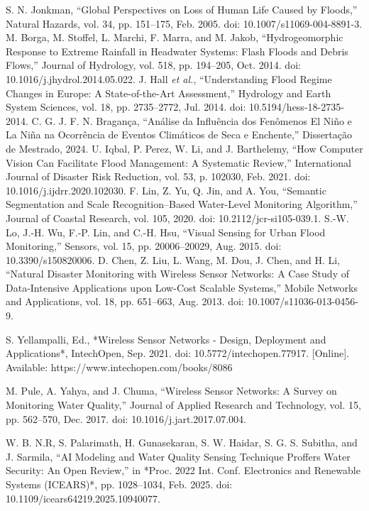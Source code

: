 \documentclass[conference]{IEEEtran}
\begin{document}
\begin{thebibliography}{00}
 S. N. Jonkman, 
``Global Perspectives on Loss of Human Life Caused by Floods,'' 
Natural Hazards, vol. 34, pp. 151--175, Feb. 2005. doi: 10.1007/s11069-004-8891-3.
 M. Borga, M. Stoffel, L. Marchi, F. Marra, and M. Jakob, 
``Hydrogeomorphic Response to Extreme Rainfall in Headwater Systems: Flash Floods and Debris Flows,'' 
Journal of Hydrology, vol. 518, pp. 194--205, Oct. 2014. doi: 10.1016/j.jhydrol.2014.05.022.
 J. Hall \textit{et al.}, 
``Understanding Flood Regime Changes in Europe: A State-of-the-Art Assessment,'' 
Hydrology and Earth System Sciences, vol. 18, pp. 2735--2772, Jul. 2014. doi: 10.5194/hess-18-2735-2014.
 C. G. J. F. N. Bragança, 
``Análise da Influência dos Fenômenos El Niño e La Niña na Ocorrência de Eventos Climáticos de Seca e Enchente,'' 
Dissertação de Mestrado, 2024.
 U. Iqbal, P. Perez, W. Li, and J. Barthelemy, 
``How Computer Vision Can Facilitate Flood Management: A Systematic Review,'' 
International Journal of Disaster Risk Reduction, vol. 53, p. 102030, Feb. 2021. doi: 10.1016/j.ijdrr.2020.102030.
 F. Lin, Z. Yu, Q. Jin, and A. You, 
``Semantic Segmentation and Scale Recognition–Based Water-Level Monitoring Algorithm,'' 
Journal of Coastal Research, vol. 105, 2020. doi: 10.2112/jcr-si105-039.1.
 S.-W. Lo, J.-H. Wu, F.-P. Lin, and C.-H. Hsu, 
``Visual Sensing for Urban Flood Monitoring,'' 
Sensors, vol. 15, pp. 20006--20029, Aug. 2015. doi: 10.3390/s150820006.
 D. Chen, Z. Liu, L. Wang, M. Dou, J. Chen, and H. Li, 
``Natural Disaster Monitoring with Wireless Sensor Networks: A Case Study of Data-Intensive Applications upon Low-Cost Scalable Systems,'' 
Mobile Networks and Applications, vol. 18, pp. 651--663, Aug. 2013. doi: 10.1007/s11036-013-0456-9.

 S. Yellampalli, Ed., 
*Wireless Sensor Networks - Design, Deployment and Applications*, IntechOpen, Sep. 2021. doi: 10.5772/intechopen.77917. [Online]. Available: https://www.intechopen.com/books/8086

 M. Pule, A. Yahya, and J. Chuma, 
``Wireless Sensor Networks: A Survey on Monitoring Water Quality,'' 
Journal of Applied Research and Technology, vol. 15, pp. 562--570, Dec. 2017. doi: 10.1016/j.jart.2017.07.004.

 W. B. N.R, S. Palarimath, H. Gunasekaran, S. W. Haidar, S. G. S. Subitha, and J. Sarmila, 
``AI Modeling and Water Quality Sensing Technique Proffers Water Security: An Open Review,'' 
in *Proc. 2022 Int. Conf. Electronics and Renewable Systems (ICEARS)*, pp. 1028--1034, Feb. 2025. doi: 10.1109/icears64219.2025.10940077.


\end{thebibliography}
\end{document}
